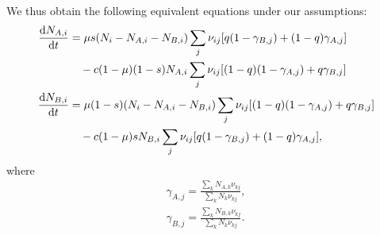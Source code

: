 \documentclass[../thesis.tex]{subfiles}
\begin{document}
We thus obtain the following equivalent equations under our assumptions:
\begin{equation}
  \begin{aligned}
    \dv{N_{A, i}}{t} 
        &= \mu s (N_i - N_{A, i} - N_{B, i})
        \sum_{j} \nu_{ij} [q (1 - \gamma_{B, j}) + (1 - q) \gamma_{A, j}]
    \\
        & \quad - c (1-\mu) (1-s) N_{A, i}
        \sum_{j} \nu_{ij} [(1 - q) (1 - \gamma_{A, j}) + q \gamma_{B, j}]
    \\
    \dv{N_{B, i}}{t} 
      &= \mu (1-s) (N_i - N_{A, i} - N_{B, i}) 
      \sum_{j} \nu_{ij} [(1 - q) (1 - \gamma_{A, j}) + q \gamma_{B, j}]
    \\
      & \quad - c (1-\mu) s N_{B, i}
      \sum_{j} \nu_{ij} [q (1 - \gamma_{B, j}) + (1 - q) \gamma_{A, j}],
  \end{aligned}
\end{equation}
where
\begin{equation}
  \begin{aligned}
  \gamma_{A, j} = \frac{
          \sum_{k} N_{A, k} \nu_{kj}
      }{
          \sum_{k} N_{k} \nu_{kj}
      },
  \\
  \gamma_{B, j} = \frac{
          \sum_{k} N_{B, k} \nu_{kj}
      }{
          \sum_{k} N_{k} \nu_{kj}
      }.
  \end{aligned}
\end{equation}
\end{document}
